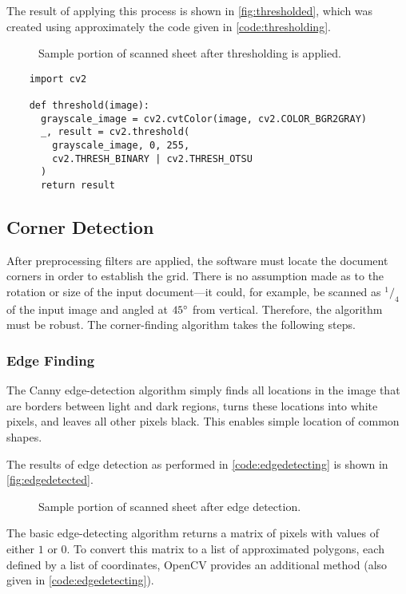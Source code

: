 \documentclass[12pt, letterpaper]{report}
\newcommand*{\itemref}[1]{\hyperref[{#1}]{\autoref*{#1}}}
\newcommand*{\boxedimage}[1]{\fbox{\texttt{[image: img/\#1]}}}
\newcommand{\fig}[3]{
  \begin{figure}[!htbp]
    \caption{#1}
    \label{#3}
    \centering
    \boxedimage{#2}
  \end{figure}
}
\begin{document}
The result of applying this process is shown in \itemref{fig:thresholded}, which
was created using approximately the code given in \itemref{code:thresholding}.

\fig{Sample portion of scanned sheet after thresholding is applied.}{sample/thresholded.jpg}{fig:thresholded}

\begin{codesample}[!htbp]
  \caption{Black-and-white conversion and thresholding of an input image.}
  \label{code:thresholding}
  \begin{verbatim}
    import cv2

    def threshold(image):
      grayscale_image = cv2.cvtColor(image, cv2.COLOR_BGR2GRAY)
      _, result = cv2.threshold(
        grayscale_image, 0, 255,
        cv2.THRESH_BINARY | cv2.THRESH_OTSU
      )
      return result
  \end{verbatim}
\end{codesample}


\subsection{Corner Detection}
\label{sect:cornerfinding}
After preprocessing filters are applied, the software must locate the document
corners in order to establish the grid. There is no assumption made as to the
rotation or size of the input document---it could, for example, be scanned as
$^1/_4$ of the input image and angled at $45\degree$ from vertical. Therefore,
the algorithm must be robust. The corner-finding algorithm takes the following
steps.

\subsubsection{Edge Finding}
The Canny edge-detection algorithm simply finds all
locations in the image that are borders between light and dark regions, turns
these locations into white pixels, and leaves all other pixels black. This
enables simple location of common shapes.

The results of edge detection as performed in \itemref{code:edgedetecting} is
shown in \itemref{fig:edgedetected}.

\fig{Sample portion of scanned sheet after edge detection.}{sample/edges.jpg}{fig:edgedetected}

The basic edge-detecting algorithm returns
a matrix of pixels with values of either $1$ or $0$. To convert this matrix to
a list of approximated polygons, each defined by a list of coordinates,
OpenCV provides an additional method (also given in \itemref{code:edgedetecting}).
\end{document}
